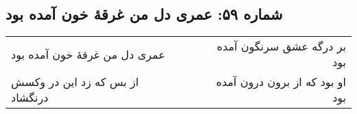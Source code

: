 \begin{center}
\section*{شماره ۵۹: عمری دل من غرقۀ خون آمده بود}
\label{sec:059}
\begin{longtable}{l p{0.5cm} r}
عمری دل من غرقهٔ خون آمده بود
&&
بر درگه عشق سرنگون آمده بود
\\
از بس که زد این در وکسش درنگشاد
&&
او بود که از برون درون آمده بود
\\
\end{longtable}
\end{center}

